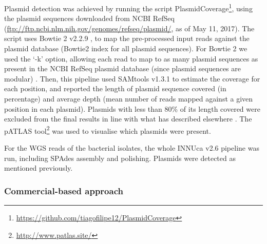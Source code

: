 Plasmid detection was achieved by running the script PlasmidCoverage\footnote{\url{https://github.com/tiagofilipe12/PlasmidCoverage}}, using the plasmid sequences downloaded from NCBI RefSeq (\url{ftp://ftp.ncbi.nlm.nih.gov/genomes/refseq/plasmid/}, as of May 11, 2017). 
The script uses Bowtie 2 v2.2.9 \citep{langmead_fast_2012}, to map the pre-processed input reads against the plasmid database (Bowtie2 index for all plasmid sequences). 
For Bowtie 2 we used the ‘-k’ option, allowing each read to map to as many plasmid sequences as present in the NCBI RefSeq plasmid database (since plasmid sequences are modular) \citep{smillie_mobility_2010, garcillan-barcia_identification_2011}. 
Then, this pipeline used SAMtools v1.3.1 \citep{li_sequence_2009} to estimate the coverage for each position, and reported the length of plasmid sequence covered (in percentage) and average depth (mean number of reads mapped against a given position in each plasmid). 
Plasmids with less than 80\% of its length covered were excluded from the final results in line with what has described elsewhere \citep{jitwasinkul_plasmid_2016}. The pATLAS tool\footnote{\url{http://www.patlas.site/}} was used to visualise which plasmids were present.

For the \ac{WGS} reads of the bacterial isolates, the whole INNUca v2.6 pipeline was run, including SPAdes assembly and polishing. 
Plasmids were detected as mentioned previously.

\subsubsection{Commercial-based approach}

